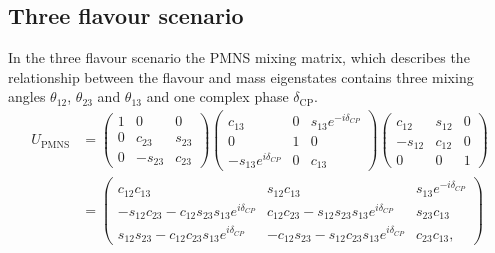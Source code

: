 \subsection{Three flavour scenario}
In the three flavour scenario the PMNS mixing matrix, which describes the relationship between the flavour and mass eigenstates contains three mixing angles $\theta_{12}$, $\theta_{23}$ and $\theta_{13}$ and one complex phase $\delta_\text{CP}$.
\begin{equation}
\begin{aligned}
U_{\text{PMNS}} &= 
\begin{pmatrix}
1 & 0 & 0 \\
0 & c_{23} & s_{23} \\
0 & -s_{23} & c_{23}
\end{pmatrix}
\begin{pmatrix}
c_{13} & 0 & s_{13} e^{-i\delta_{CP}} \\
0 & 1 & 0 \\
-s_{13} e^{i\delta_{CP}} & 0 & c_{13}
\end{pmatrix}
\begin{pmatrix}
c_{12} & s_{12} & 0 \\
-s_{12} & c_{12} & 0 \\
0 & 0 & 1
\end{pmatrix} \\
&=
\begin{pmatrix}
c_{12} c_{13} & s_{12} c_{13} & s_{13} e^{-i\delta_{CP}} \\
-s_{12} c_{23} - c_{12} s_{23} s_{13} e^{i\delta_{CP}} & c_{12} c_{23} - s_{12} s_{23} s_{13} e^{i\delta_{CP}} & s_{23} c_{13} \\
s_{12} s_{23} - c_{12} c_{23} s_{13} e^{i\delta_{CP}} & -c_{12} s_{23} - s_{12} c_{23} s_{13} e^{i\delta_{CP}} & c_{23} c_{13} ,
\end{pmatrix}
\end{aligned}
\end{equation}

